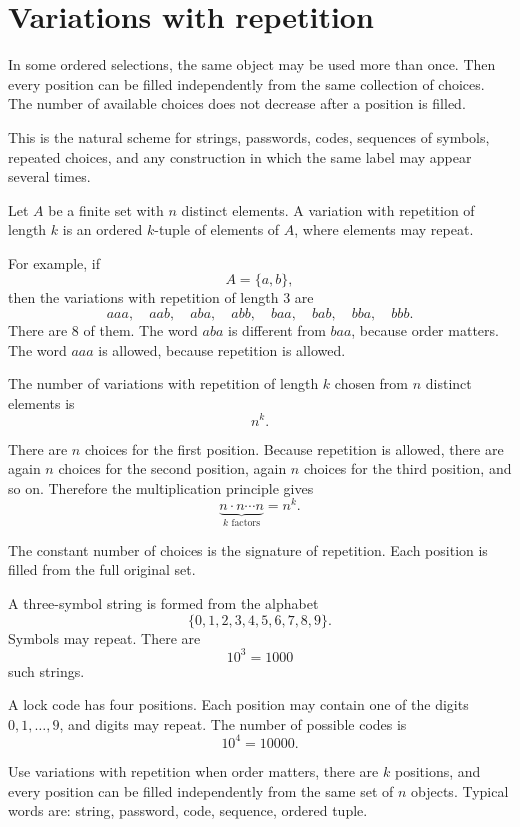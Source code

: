 \section{Variations with repetition}

In some ordered selections, the same object may be used more than once. Then every position can be filled independently from the same collection of choices. The number of available choices does not decrease after a position is filled.

This is the natural scheme for strings, passwords, codes, sequences of symbols, repeated choices, and any construction in which the same label may appear several times.

\begin{definitionbox}
Let \(A\) be a finite set with \(n\) distinct elements. A variation with repetition of length \(k\) is an ordered \(k\)-tuple of elements of \(A\), where elements may repeat.
\end{definitionbox}

For example, if
\[
A=\{a,b\},
\]
then the variations with repetition of length \(3\) are
\[
aaa,\quad aab,\quad aba,\quad abb,\quad baa,\quad bab,\quad bba,\quad bbb.
\]
There are \(8\) of them. The word \(aba\) is different from \(baa\), because order matters. The word \(aaa\) is allowed, because repetition is allowed.

\begin{theorembox}
The number of variations with repetition of length \(k\) chosen from \(n\) distinct elements is
\[
n^k.
\]
\end{theorembox}

There are \(n\) choices for the first position. Because repetition is allowed, there are again \(n\) choices for the second position, again \(n\) choices for the third position, and so on. Therefore the multiplication principle gives
\[
\underbrace{n\cdot n\cdots n}_{k\text{ factors}}=n^k.
\]

The constant number of choices is the signature of repetition. Each position is filled from the full original set.

\begin{examplebox}
A three-symbol string is formed from the alphabet
\[
\{0,1,2,3,4,5,6,7,8,9\}.
\]
Symbols may repeat. There are
\[
10^3=1000
\]
such strings.
\end{examplebox}

\begin{examplebox}
A lock code has four positions. Each position may contain one of the digits \(0,1,\ldots,9\), and digits may repeat. The number of possible codes is
\[
10^4=10000.
\]
\end{examplebox}

\begin{remarkbox}
Use variations with repetition when order matters, there are \(k\) positions, and every position can be filled independently from the same set of \(n\) objects. Typical words are: string, password, code, sequence, ordered tuple.
\end{remarkbox}
